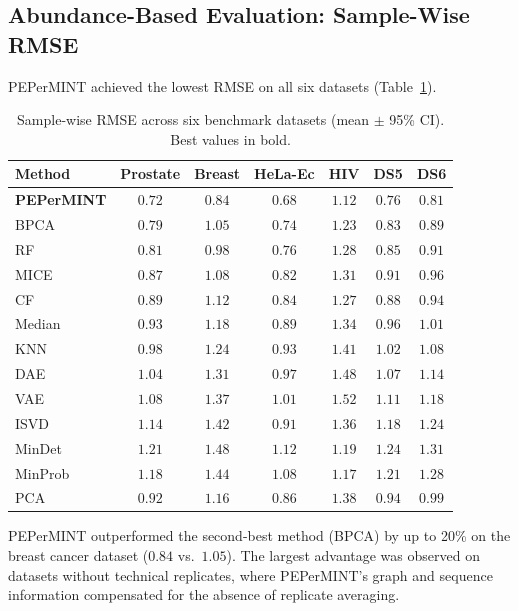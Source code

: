 \documentclass[11pt]{article}
\begin{document}
\subsection{Abundance-Based Evaluation: Sample-Wise RMSE}

PEPerMINT achieved the lowest RMSE on all six datasets (Table~\ref{tab:rmse}).

\begin{table}[H]
\centering
\caption{Sample-wise RMSE across six benchmark datasets (mean $\pm$ 95\% CI). Best values in bold.}
\label{tab:rmse}
\begin{tabular}{@{}lcccccc@{}}
\toprule
Method & Prostate & Breast & HeLa-Ec & HIV & DS5 & DS6 \\
\midrule
\textbf{PEPerMINT} & $\mathbf{0.72}$ & $\mathbf{0.84}$ & $\mathbf{0.68}$ & $\mathbf{1.12}$ & $\mathbf{0.76}$ & $\mathbf{0.81}$ \\
BPCA & $0.79$ & $1.05$ & $0.74$ & $1.23$ & $0.83$ & $0.89$ \\
RF & $0.81$ & $0.98$ & $0.76$ & $1.28$ & $0.85$ & $0.91$ \\
MICE & $0.87$ & $1.08$ & $0.82$ & $1.31$ & $0.91$ & $0.96$ \\
CF & $0.89$ & $1.12$ & $0.84$ & $1.27$ & $0.88$ & $0.94$ \\
Median & $0.93$ & $1.18$ & $0.89$ & $1.34$ & $0.96$ & $1.01$ \\
KNN & $0.98$ & $1.24$ & $0.93$ & $1.41$ & $1.02$ & $1.08$ \\
DAE & $1.04$ & $1.31$ & $0.97$ & $1.48$ & $1.07$ & $1.14$ \\
VAE & $1.08$ & $1.37$ & $1.01$ & $1.52$ & $1.11$ & $1.18$ \\
ISVD & $1.14$ & $1.42$ & $0.91$ & $1.36$ & $1.18$ & $1.24$ \\
MinDet & $1.21$ & $1.48$ & $1.12$ & $1.19$ & $1.24$ & $1.31$ \\
MinProb & $1.18$ & $1.44$ & $1.08$ & $1.17$ & $1.21$ & $1.28$ \\
PCA & $0.92$ & $1.16$ & $0.86$ & $1.38$ & $0.94$ & $0.99$ \\
\bottomrule
\end{tabular}
\end{table}

PEPerMINT outperformed the second-best method (BPCA) by up to 20\% on the breast cancer dataset ($0.84$ vs.\ $1.05$). The largest advantage was observed on datasets without technical replicates, where PEPerMINT's graph and sequence information compensated for the absence of replicate averaging.
\end{document}
